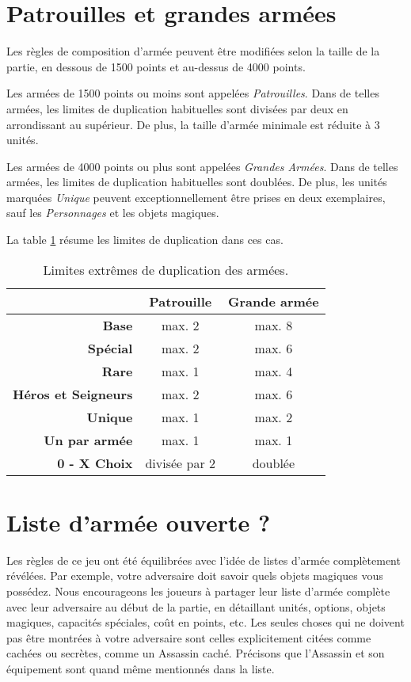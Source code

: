 \section{Patrouilles et grandes armées}

Les règles de composition d'armée peuvent être modifiées selon la taille de la partie, en dessous de 1500 points et au-dessus de 4000 points.

Les armées de 1500 points ou moins sont appelées \emph{Patrouilles}. Dans de telles armées, les limites de duplication habituelles sont divisées par deux en arrondissant au supérieur. De plus, la taille d'armée minimale est réduite à 3 unités.

Les armées de 4000 points ou plus sont appelées \emph{Grandes Armées}. Dans de telles armées, les limites de duplication habituelles sont doublées. De plus, les unités marquées \emph{Unique} peuvent exceptionnellement être prises en deux exemplaires, sauf les \emph{Personnages} et les objets magiques.

La table \ref{table/patrouille_et_grande_armee} résume les limites de duplication dans ces cas.

\begin{table}[!htbp]
\centering
\begin{tabular}{rcc}
\hline
 							& \textbf{Patrouille} 	& \textbf{Grande armée} \tabularnewline
\hline
\textbf{Base} 				& max. 2	 			& max. 8	 			\tabularnewline
\textbf{Spécial} 			& max. 2	 			& max. 6	 			\tabularnewline
\textbf{Rare} 				& max. 1	 			& max. 4	 			\tabularnewline
\textbf{Héros et Seigneurs} & max. 2	 			& max. 6	 			\tabularnewline
\textbf{Unique}			    & max. 1	 			& max. 2	 			\tabularnewline
\textbf{Un par armée}		& max. 1	 			& max. 1	 			\tabularnewline
\textbf{0 - X Choix} 		& divisée par 2			& doublée				\tabularnewline
\hline
\end{tabular}
\caption{\label{table/patrouille_et_grande_armee}Limites extrêmes de duplication des armées.}
\end{table}

\section{Liste d'armée ouverte ?}

Les règles de ce jeu ont été équilibrées avec l'idée de listes d'armée complètement révélées. Par exemple, votre adversaire doit savoir quels objets magiques vous possédez. Nous encourageons les joueurs à partager leur liste d'armée complète avec leur adversaire au début de la partie, en détaillant unités, options, objets magiques, capacités spéciales, coût en points, etc. Les seules choses qui ne doivent pas être montrées à votre adversaire sont celles explicitement citées comme cachées ou secrètes, comme un Assassin caché. Précisons que l'Assassin et son équipement sont quand même mentionnés dans la liste.

